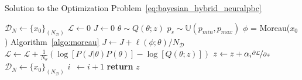\begin{algorithm}
    \caption{Solution to the Optimization Problem~\eqref{eq:bayesian_hybrid_neuralpbc}}
    \label{algo:bayes_neuralpbc}
    \small
    \begin{algorithmic}[1]
        \algrenewcommand\algorithmicindent{0em} %
        \State $\mathcal{D}_N \gets \{x_0\}_{(N_{\mathcal{D}})}$   
        \algrenewcommand\algorithmicindent{1.1em} %
        \State $\mathcal{L} \gets 0$ 
         
        \State $J \gets 0$ 
        \State $\theta \sim Q(\theta; z)$ 
            \State $p_s \sim \mathbb{U}(p_{min}, p_{max})$
            \State $\phi$ = Moreau($x_0$) \Comment Algorithm~\eqref{algo:moreau}
            \State $J \gets J + \ell(\phi; \theta)/N_{\mathcal{D}}$ 
            \EndFor
        \State $\mathcal{L} \gets \mathcal{L} + \frac{1}{N_{\theta}} \left(\log[P(J | \theta) P(\theta)] - \log[Q(\theta;z)]\right)$
        \EndFor
        \State $z \gets z + \alpha_i \nicefrac{\partial \mathcal{L}}{\partial z}$
        \State $\mathcal{D}_N \gets \{x_0\}_{(N_{\mathcal{D}})}$
        \State $i \;\:\gets i + 1$
        \EndWhile
        \State \textbf{return} $z$
    \end{algorithmic}
\end{algorithm}
